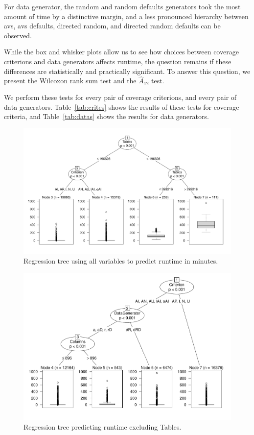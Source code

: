 For data generator, the random and random defaults generators took the
most amount of time by a distinctive margin, and a less pronounced
hierarchy between avs, avs defaults, directed random, and directed
random defaults can be observed.  

While the box and whisker plots allow us to see how choices between
coverage criterions and data generators affects runtime, the question
remains if these differences are statistically and practically
significant. To answer this question, we present the Wilcoxon rank sum
test and the $\hat{A}_{12}$ test.  


We perform these tests for every pair
of coverage criterions, and every pair of data generators.
Table~\ref{tab:crites} shows the results of these tests for coverage
criteria, and Table~\ref{tab:datas} shows the results for data
generators.

\begin{figure}
\centering
  \centering
  \includegraphics[width=.75\linewidth]{../diagrams/AllTree.pdf}
  \caption{Regression tree using all variables to predict runtime in
  minutes. \vspace{-.15in}}
  \label{fig:atree}
  \vspace{-.15in} 
\end{figure}

\begin{figure}
\centering
  \centering
  \includegraphics[width=.75\linewidth]{../diagrams/NoTableCtreesd.pdf}
  \caption{Regression tree predicting runtime excluding Tables.\vspace{-.15in}}
  \label{fig:ttree}
  \vspace{-.15in} 
\end{figure}


